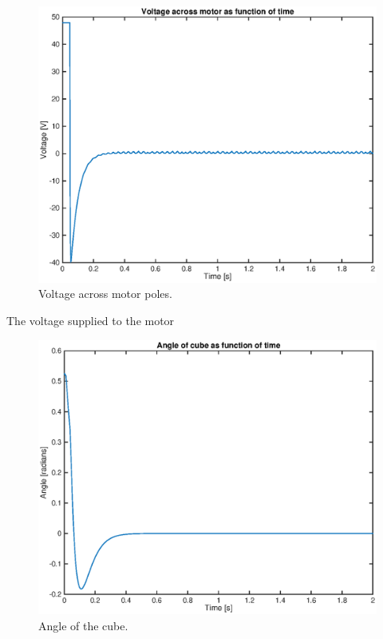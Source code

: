 \documentclass[a4paper,11pt]{kth-mag}
\begin{document}
\begin{figure}[!htb]
\centering
\includegraphics[scale=.7]{voltageplot.eps}
\caption{Voltage across motor poles.}
\label{fig:voltageplot}
\end{figure}

The voltage supplied to the motor

\begin{figure}[!htb]
\centering
\includegraphics[scale=.7]{angleplot.eps}
\caption{Angle of the cube.}
\label{fig:voltageplot}
\end{figure}
\end{document}
